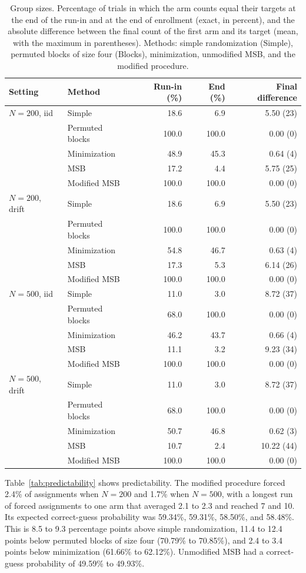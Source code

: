 \documentclass[bib]{statapress}
\begin{document}
\begin{table}[htbp]
\centering
\footnotesize
\caption{Group sizes. Percentage of trials in which the arm counts equal their
targets at the end of the run-in and at the end of enrollment (exact, in
percent), and the absolute
difference between the final count of the first arm and its target (mean, with
the maximum in parentheses). Methods: simple randomization (Simple), permuted
blocks of size four (Blocks), minimization, unmodified MSB, and the modified
procedure.}
\label{tab:sizes}
\begin{tabular}{llrrr}
\hline
Setting & Method & Run-in (\%) & End (\%) & Final difference \\
\hline
$N=200$, iid & Simple & 18.6 & 6.9 & 5.50 (23) \\
 & Permuted blocks & 100.0 & 100.0 & 0.00 (0) \\
 & Minimization & 48.9 & 45.3 & 0.64 (4) \\
 & MSB & 17.2 & 4.4 & 5.75 (25) \\
 & Modified MSB & 100.0 & 100.0 & 0.00 (0) \\
$N=200$, drift & Simple & 18.6 & 6.9 & 5.50 (23) \\
 & Permuted blocks & 100.0 & 100.0 & 0.00 (0) \\
 & Minimization & 54.8 & 46.7 & 0.63 (4) \\
 & MSB & 17.3 & 5.3 & 6.14 (26) \\
 & Modified MSB & 100.0 & 100.0 & 0.00 (0) \\
$N=500$, iid & Simple & 11.0 & 3.0 & 8.72 (37) \\
 & Permuted blocks & 68.0 & 100.0 & 0.00 (0) \\
 & Minimization & 46.2 & 43.7 & 0.66 (4) \\
 & MSB & 11.1 & 3.2 & 9.23 (34) \\
 & Modified MSB & 100.0 & 100.0 & 0.00 (0) \\
$N=500$, drift & Simple & 11.0 & 3.0 & 8.72 (37) \\
 & Permuted blocks & 68.0 & 100.0 & 0.00 (0) \\
 & Minimization & 50.7 & 46.8 & 0.62 (3) \\
 & MSB & 10.7 & 2.4 & 10.22 (44) \\
 & Modified MSB & 100.0 & 100.0 & 0.00 (0) \\
\hline
\end{tabular}
\end{table}

Table~\ref{tab:predictability} shows predictability. The modified procedure
forced 2.4\% of assignments when $N = 200$ and 1.7\% when $N = 500$, with a
longest run of forced assignments to one arm that averaged 2.1 to 2.3 and
reached 7 and 10. Its expected correct-guess probability was 59.34\%, 59.31\%,
58.50\%, and 58.48\%. This is 8.5 to 9.3 percentage points above simple
randomization, 11.4 to 12.4 points below permuted blocks of size four
(70.79\% to 70.85\%), and 2.4 to 3.4 points below minimization (61.66\% to
62.12\%). Unmodified MSB had a correct-guess probability of 49.59\% to 49.93\%.
\end{document}
